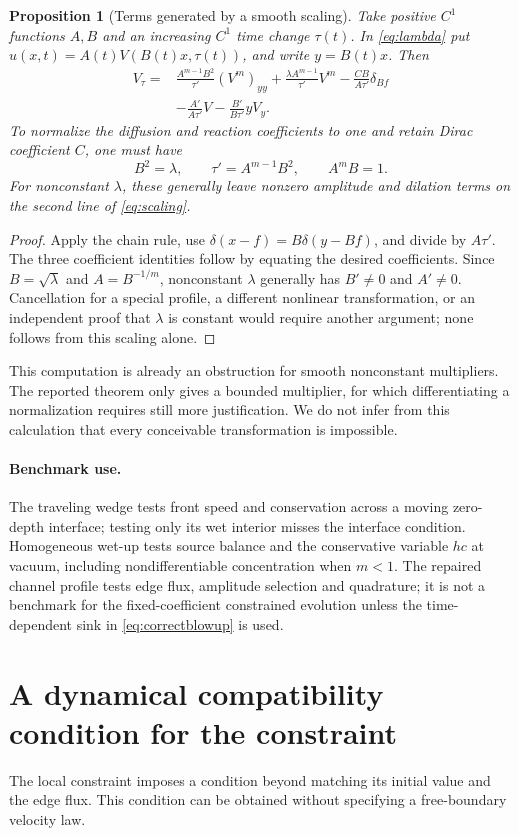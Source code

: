 \documentclass[11pt,a4paper]{article}
\newtheorem{proposition}[theorem]{Proposition}
\theoremstyle{remark}\newtheorem{remark}[theorem]{Remark}
\begin{document}
\begin{proposition}[Terms generated by a smooth scaling]
Take positive $C^1$ functions $A,B$ and an increasing $C^1$ time change $\tau(t)$. In \eqref{eq:lambda} put $u(x,t)=A(t)V(B(t)x,\tau(t))$, and write $y=B(t)x$. Then
\begin{align}
 V_\tau={}&\frac{A^{m-1}B^2}{\tau'}(V^m)_{yy}
 +\frac{\lambda A^{m-1}}{\tau'}V^m
 -\frac{CB}{A\tau'}\delta_{Bf}\nonumber\\
 &-\frac{A'}{A\tau'}V-\frac{B'}{B\tau'}yV_y.\label{eq:scaling}
\end{align}
To normalize the diffusion and reaction coefficients to one and retain Dirac coefficient $C$, one must have
\[
 B^2=\lambda,\qquad \tau'=A^{m-1}B^2,\qquad A^mB=1.
\]
For nonconstant $\lambda$, these generally leave nonzero amplitude and dilation terms on the second line of \eqref{eq:scaling}.
\end{proposition}
\begin{proof}
Apply the chain rule, use $\delta(x-f)=B\delta(y-Bf)$, and divide by $A\tau'$. The three coefficient identities follow by equating the desired coefficients. Since $B=\sqrt\lambda$ and $A=B^{-1/m}$, nonconstant $\lambda$ generally has $B'\ne0$ and $A'\ne0$. Cancellation for a special profile, a different nonlinear transformation, or an independent proof that $\lambda$ is constant would require another argument; none follows from this scaling alone.
\end{proof}
This computation is already an obstruction for smooth nonconstant multipliers. The reported theorem only gives a bounded multiplier, for which differentiating a normalization requires still more justification. We do not infer from this calculation that every conceivable transformation is impossible.

\paragraph{Benchmark use.}
The traveling wedge tests front speed and conservation across a moving zero-depth
interface; testing only its wet interior misses the interface condition.
Homogeneous wet-up tests source balance and the conservative variable $hc$ at
vacuum, including nondifferentiable concentration when $m<1$.
The repaired channel profile tests edge flux, amplitude selection and quadrature;
it is not a benchmark for the fixed-coefficient constrained evolution unless the
time-dependent sink in \eqref{eq:correctblowup} is used.

\section{A dynamical compatibility condition for the constraint}
The local constraint imposes a condition beyond matching its initial value
and the edge flux. This condition can be obtained without specifying a
free-boundary velocity law.
\end{document}
